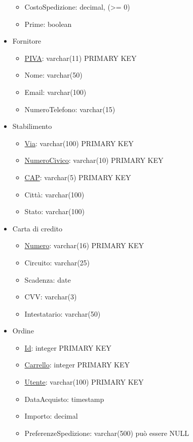 \documentclass[11pt]{article}
\begin{document}
\begin{itemize}
\begin{itemize}
        \item CostoSpedizione: decimal, (\textgreater{}= 0)
        \item Prime: boolean
    \end{itemize}
    \item Fornitore
    \begin{itemize}
        \item \underline{PIVA}: varchar(11) PRIMARY KEY
        \item Nome: varchar(50)
        \item Email: varchar(100)
        \item NumeroTelefono: varchar(15)
    \end{itemize}
    \item Stabilimento
    \begin{itemize}
        \item \underline{Via}: varchar(100) PRIMARY KEY
        \item \underline{NumeroCivico}: varchar(10) PRIMARY KEY
        \item \underline{CAP}: varchar(5) PRIMARY KEY
        \item Città: varchar(100)
        \item Stato: varchar(100)
    \end{itemize}
    \item Carta di credito
    \begin{itemize}
        \item \underline{Numero}: varchar(16) PRIMARY KEY
        \item Circuito: varchar(25)
        \item Scadenza: date
        \item CVV: varchar(3)
        \item Intestatario: varchar(50)
    \end{itemize}
    \item Ordine
    \begin{itemize}
        \item \underline{Id}: integer PRIMARY KEY
        \item \underline{Carrello}: integer PRIMARY KEY
        \item \underline{Utente}: varchar(100) PRIMARY KEY
        \item DataAcquisto: timestamp
        \item Importo: decimal
        \item PreferenzeSpedizione: varchar(500) può essere NULL
    \end{itemize}

\end{itemize}
\end{document}
